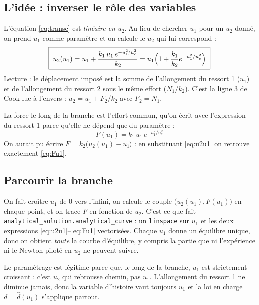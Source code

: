 \documentclass[11pt,a4paper]{article}
\begin{document}
\subsection{L'idée : inverser le rôle des variables}
L'équation \eqref{eq:transc} est \emph{linéaire en $u_2$}. Au lieu de chercher $u_1$ pour un
$u_2$ donné, on prend $u_1$ comme paramètre et on calcule le $u_2$ qui lui correspond :
\begin{equation}
  \boxed{\;u_2(u_1) = u_1 + \frac{k_1\,u_1\,e^{-u_1^2/u_c^2}}{k_2}
  = u_1\Bigl(1 + \frac{k_1}{k_2}e^{-u_1^2/u_c^2}\Bigr)\;}
  \label{eq:u2u1}
\end{equation}
Lecture : le déplacement imposé est la somme de l'allongement du ressort 1 ($u_1$) et de
l'allongement du ressort 2 sous le même effort ($N_1/k_2$). C'est la ligne 3 de Cook lue à
l'envers : $u_2 = u_1 + F_2/k_2$ avec $F_2 = N_1$.

La force le long de la branche est l'effort commun, qu'on écrit avec l'expression du
ressort 1 parce qu'elle ne dépend que du paramètre :
\begin{equation}
  \boxed{\;F(u_1) = k_1\,u_1\,e^{-u_1^2/u_c^2}\;}
  \label{eq:Fu1}
\end{equation}
On aurait pu écrire $F = k_2\bigl(u_2(u_1) - u_1\bigr)$ : en substituant \eqref{eq:u2u1} on
retrouve exactement \eqref{eq:Fu1}.

\subsection{Parcourir la branche}
On fait croître $u_1$ de $0$ vers l'infini, on calcule le couple $\bigl(u_2(u_1), F(u_1)\bigr)$
en chaque point, et on trace $F$ en fonction de $u_2$. C'est ce que fait
\texttt{analytical\_solution.analytical\_curve} : un \texttt{linspace} sur $u_1$ et les deux
expressions \eqref{eq:u2u1}--\eqref{eq:Fu1} vectorisées. Chaque $u_1$ donne un équilibre
unique, donc on obtient \emph{toute} la courbe d'équilibre, y compris la partie que ni
l'expérience ni le Newton piloté en $u_2$ ne peuvent suivre.

Le paramétrage est légitime parce que, le long de la branche, $u_1$ est strictement
croissant : c'est $u_2$ qui rebrousse chemin, pas $u_1$. L'allongement du ressort 1 ne
diminue jamais, donc la variable d'histoire vaut toujours $u_1$ et la loi en charge
$d = \hat d(u_1)$ s'applique partout.
\end{document}
